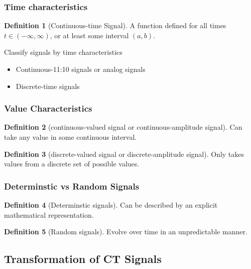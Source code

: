 \documentclass{article}
\theoremstyle{definition}
\newtheorem{definition}{Definition}[subsection]
\begin{document}
\subsubsection{Time characteristics}
\begin{definition}[Continuous-time Signal]
    A function defined for all times $ t \in (-\infty,\infty) $, or at least some interval $ (a,b) $.
\end{definition}
Classify signals by time characteristics
\begin{itemize}
    \item Continuous-11:10 signals or analog signals
    \item Discrete-time signals
\end{itemize}
\subsubsection{Value Characteristics}
\begin{definition}[continuous-valued signal or continuous-amplitude signal]
    Can take any value in some continuous interval.
\end{definition}
\begin{definition}[discrete-valued signal or discrete-amplitude signal]
    Only takes values from a discrete set of possible values.
\end{definition}
\subsubsection{Determinstic vs Random Signals}
\begin{definition}[Determinstic signals]
    Can be described by an explicit mathematical representation.
\end{definition}
\begin{definition}[Random signals]
    Evolve over time in an unpredictable manner.
\end{definition}

\subsection{Transformation of CT Signals}
\end{document}
